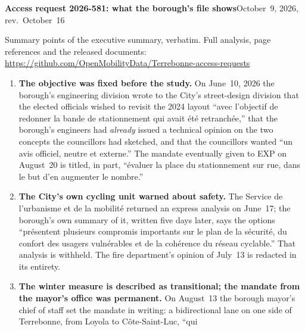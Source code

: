 \documentclass[10pt,letterpaper]{article}
\newcommand{\repourl}{https://github.com/OpenMobilityData/Terrebonne-access-requests}
\newcommand{\repo}[1]{\href{\repourl}{#1}}
\begin{document}
{\large\bfseries Access request 2026-581: what the borough's file shows}\hfill{\small October~9, 2026, rev.\ October~16}

\vspace{-0.2em}
{\small Summary points of the executive summary, verbatim. Full analysis, page references and the released documents:\\ \repo{\repourl}}
\vspace{0.4em}

\begin{enumerate}[nosep,itemsep=0.3em,leftmargin=1.4em]
  \item \begin{minipage}[t]{\linewidth}\textbf{The objective was fixed before the study.} On June~10, 2026 the
    borough's engineering division wrote to the City's street-design
    division that the elected officials wished to revisit the 2024 layout
    ``avec l'objectif de redonner la bande de stationnement qui avait \'et\'e
    retranch\'ee,'' that the borough's engineers had \emph{already} issued a
    technical opinion on the two concepts the councillors had sketched, and
    that the councillors wanted ``un avis officiel, neutre et externe.'' The
    mandate eventually given to EXP on August~20 is titled, in part,
    ``\'evaluer la place du stationnement sur rue, dans le but d'en augmenter
    le nombre.''\end{minipage}\vspace{0.35em}
\item \begin{minipage}[t]{\linewidth}\textbf{The City's own cycling unit warned about safety.} The
    Service de l'urbanisme et de la mobilit\'e returned an express analysis on
    June~17; the borough's own summary of it, written five days later, says
    the options ``pr\'esentent plusieurs compromis importants sur le plan de
    la s\'ecurit\'e, du confort des usagers vuln\'erables et de la coh\'erence
    du r\'eseau cyclable.'' That analysis is withheld. The fire department's
    opinion of July~13 is redacted in its entirety.\end{minipage}\vspace{0.35em}
\item \begin{minipage}[t]{\linewidth}\textbf{The winter measure is described as transitional; the
    mandate from the mayor's office was permanent.} On August~13 the borough
    mayor's chief of staff set the mandate in writing: a bidirectional lane
    on one side of Terrebonne, from Loyola to C\^ote-Saint-Luc, ``qui

\end{minipage}
\end{enumerate}
\end{document}
